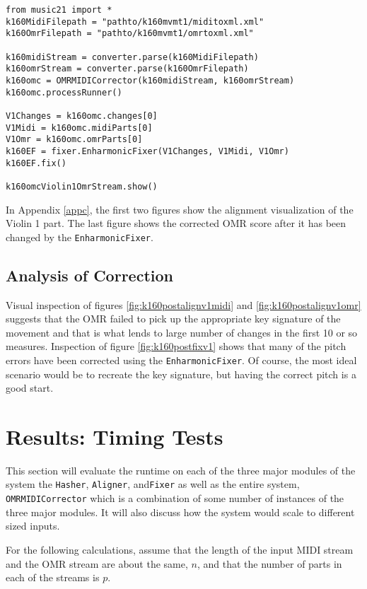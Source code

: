 \begin{verbatim}
from music21 import *
k160MidiFilepath = "pathto/k160mvmt1/miditoxml.xml"
k160OmrFilepath = "pathto/k160mvmt1/omrtoxml.xml"
         
k160midiStream = converter.parse(k160MidiFilepath)
k160omrStream = converter.parse(k160OmrFilepath)
k160omc = OMRMIDICorrector(k160midiStream, k160omrStream)
k160omc.processRunner()
        
V1Changes = k160omc.changes[0]
V1Midi = k160omc.midiParts[0]
V1Omr = k160omc.omrParts[0]
k160EF = fixer.EnharmonicFixer(V1Changes, V1Midi, V1Omr)
k160EF.fix()

k160omcViolin1OmrStream.show()
\end{verbatim}

In Appendix \ref{appc}, the first two figures show the alignment visualization of the Violin 1 part. The last figure shows the corrected OMR score after it has been changed by the \texttt{EnharmonicFixer}.

\subsection{Analysis of Correction}
Visual inspection of figures \ref{fig:k160postalignv1midi} and \ref{fig:k160postalignv1omr} suggests that the OMR failed to pick up the appropriate key signature of the movement and that is what lends to large number of changes in the first 10 or so measures. Inspection of figure \ref{fig:k160postfixv1} shows that many of the pitch errors have been corrected using the \texttt{EnharmonicFixer}. Of course, the most ideal scenario would be to recreate the key signature, but having the correct pitch is a good start. 

\section{Results: Timing Tests} \label{timing}
This section will evaluate the runtime on each of the three major modules of the system the \texttt{Hasher}, \texttt{Aligner}, and\texttt{Fixer} as well as the entire system, \texttt{OMRMIDICorrector} which is a combination of some number of instances of the three major modules. It will also discuss how the system would scale to different sized inputs. 

For the following calculations, assume that the length of the input MIDI stream and the OMR stream are about the same, $n$, and that the number of parts in each of the streams is $p$. 

